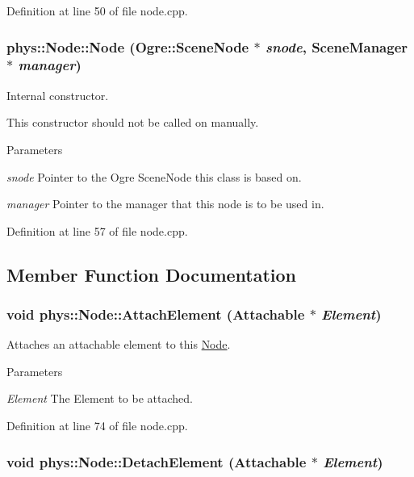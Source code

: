 Definition at line 50 of file node.cpp.

\hypertarget{classphys_1_1Node_af0f42610cf0adcef9e4dea16013cbaf2}{
\subsubsection[{Node}]{\setlength{\rightskip}{0pt plus 5cm}phys::Node::Node (Ogre::SceneNode $\ast$ {\em snode}, \/  {\bf SceneManager} $\ast$ {\em manager})}}
\label{d0/ddc/classphys_1_1Node_af0f42610cf0adcef9e4dea16013cbaf2}


Internal constructor. 

This constructor should not be called on manually. 
\begin{DoxyParams}{Parameters}
\item[{\em snode}]Pointer to the Ogre SceneNode this class is based on. \item[{\em manager}]Pointer to the manager that this node is to be used in. \end{DoxyParams}


Definition at line 57 of file node.cpp.



\subsection{Member Function Documentation}
\hypertarget{classphys_1_1Node_a8de0f86b08510a08a6e6c0912c9caddb}{
\subsubsection[{AttachElement}]{\setlength{\rightskip}{0pt plus 5cm}void phys::Node::AttachElement ({\bf Attachable} $\ast$ {\em Element})}}
\label{d0/ddc/classphys_1_1Node_a8de0f86b08510a08a6e6c0912c9caddb}


Attaches an attachable element to this \hyperlink{classphys_1_1Node}{Node}. 


\begin{DoxyParams}{Parameters}
\item[{\em Element}]The Element to be attached. \end{DoxyParams}


Definition at line 74 of file node.cpp.

\hypertarget{classphys_1_1Node_afdafaa00a4c6873211968529993a2b48}{
\subsubsection[{DetachElement}]{\setlength{\rightskip}{0pt plus 5cm}void phys::Node::DetachElement ({\bf Attachable} $\ast$ {\em Element})}}
\label{d0/ddc/classphys_1_1Node_afdafaa00a4c6873211968529993a2b48}


